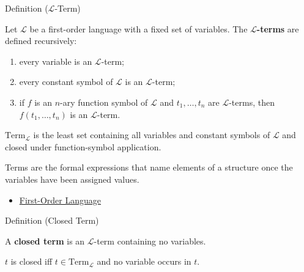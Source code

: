 
\begin{definitionbox}{Definition ($\mathcal{L}$-Term)}
\begin{definition}\label{def:l-term}
Let $\mathcal{L}$ be a first-order language with a fixed set of variables.
The \textbf{$\mathcal{L}$-terms} are defined recursively:
\begin{enumerate}
  \item every variable is an $\mathcal{L}$-term;
  \item every constant symbol of $\mathcal{L}$ is an $\mathcal{L}$-term;
  \item if $f$ is an $n$-ary function symbol of $\mathcal{L}$ and
        $t_1,\ldots,t_n$ are $\mathcal{L}$-terms, then
        $f(t_1,\ldots,t_n)$ is an $\mathcal{L}$-term.
\end{enumerate}
\end{definition}
\end{definitionbox}

\begin{remark*}
$\mathrm{Term}_{\mathcal{L}}$ is the least set containing all variables and
constant symbols of $\mathcal{L}$ and closed under function-symbol
application.
\end{remark*}

\begin{remark*}[Interpretation]
Terms are the formal expressions that name elements of a structure once the
variables have been assigned values.
\end{remark*}

\begin{dependencies}
\begin{itemize}
  \item \hyperref[def:first-order-language]{First-Order Language}
\end{itemize}
\end{dependencies}

\begin{definitionbox}{Definition (Closed Term)}
\begin{definition}\label{def:closed-term}
A \textbf{closed term} is an $\mathcal{L}$-term containing no variables.
\end{definition}
\end{definitionbox}

\begin{remark*}
$t$ is closed iff $t\in\mathrm{Term}_{\mathcal{L}}$ and no variable occurs in
$t$.
\end{remark*}

